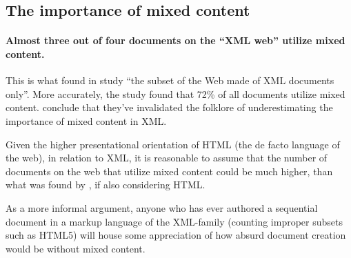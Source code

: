 \documentclass{scrreprt}
\begin{document}



\subsection{The importance of mixed content}
\paragraph{Almost three out of four documents on the ``XML web'' utilize mixed content.} This is what \citet{mignet} found in  study ``the subset of the Web made of XML documents only''. More accurately, the study found that 72\% of all documents utilize mixed content. \citet{mignet} conclude that they've invalidated the folklore of underestimating the importance of mixed content in XML.

Given the higher presentational orientation of HTML (the de facto language of the web), in relation to XML, it is reasonable to assume that the number of documents on the web that utilize mixed content could be much higher, than what was found by \citet{mignet}, if also considering HTML.

As a more informal argument, anyone who has ever authored a sequential document in a markup language of the XML-family (counting improper subsets such as HTML5) will house some appreciation of how absurd document creation would be without mixed content.





% 
\end{document}

